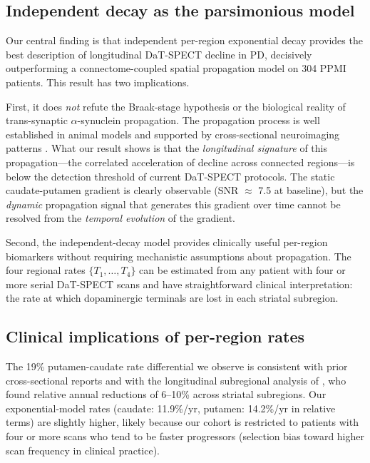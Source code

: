 \subsection{Independent decay as the parsimonious model}

Our central finding is that independent per-region exponential decay provides the best description of longitudinal DaT-SPECT decline in PD, decisively outperforming a connectome-coupled spatial propagation model on 304 PPMI patients. This result has two implications.

First, it does \textit{not} refute the Braak-stage hypothesis or the biological reality of trans-synaptic $\alpha$-synuclein propagation. The propagation process is well established in animal models \cite{chu2019, patterson2019} and supported by cross-sectional neuroimaging patterns \cite{pandya2019, abdelgawad2022}. What our result shows is that the \textit{longitudinal signature} of this propagation---the correlated acceleration of decline across connected regions---is below the detection threshold of current DaT-SPECT protocols. The static caudate-putamen gradient is clearly observable (SNR $\approx$ 7.5 at baseline), but the \textit{dynamic} propagation signal that generates this gradient over time cannot be resolved from the \textit{temporal evolution} of the gradient.

Second, the independent-decay model provides clinically useful per-region biomarkers without requiring mechanistic assumptions about propagation. The four regional rates $\{T_1, \ldots, T_4\}$ can be estimated from any patient with four or more serial DaT-SPECT scans and have straightforward clinical interpretation: the rate at which dopaminergic terminals are lost in each striatal subregion.

\subsection{Clinical implications of per-region rates}

The 19\% putamen-caudate rate differential we observe is consistent with prior cross-sectional reports \cite{kish1988, brooks1990} and with the longitudinal subregional analysis of \cite{sung2016}, who found relative annual reductions of 6--10\% across striatal subregions. Our exponential-model rates (caudate: 11.9\%/yr, putamen: 14.2\%/yr in relative terms) are slightly higher, likely because our cohort is restricted to patients with four or more scans who tend to be faster progressors (selection bias toward higher scan frequency in clinical practice).

